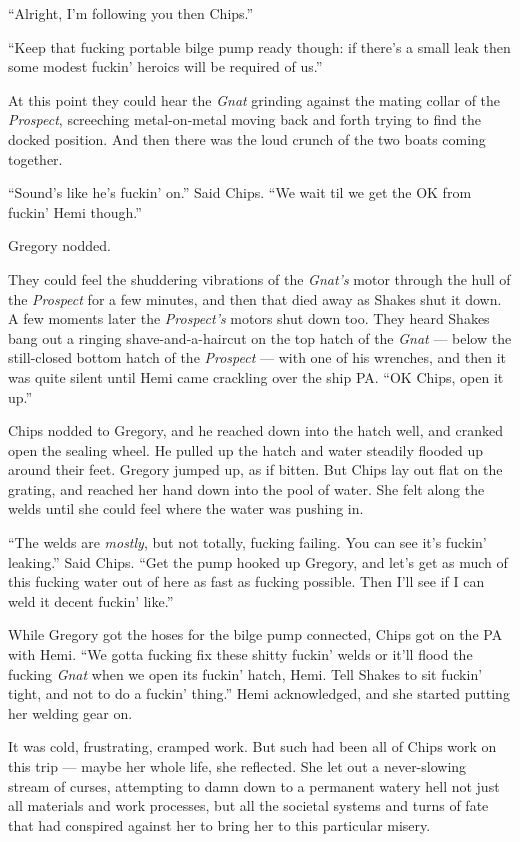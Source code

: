 \documentclass[
]{scrbook}
\begin{document}
``Alright, I'm following you then Chips.''

``Keep that fucking portable bilge pump ready though: if there's a small
leak then some modest fuckin' heroics will be required of us.''

At this point they could hear the \emph{Gnat} grinding against the
mating collar of the \emph{Prospect}, screeching metal-on-metal moving
back and forth trying to find the docked position. And then there was
the loud crunch of the two boats coming together.

``Sound's like he's fuckin' on.'' Said Chips. ``We wait til we get the
OK from fuckin' Hemi though.''

Gregory nodded.

They could feel the shuddering vibrations of the \emph{Gnat's} motor
through the hull of the \emph{Prospect} for a few minutes, and then that
died away as Shakes shut it down. A few moments later the
\emph{Prospect's} motors shut down too. They heard Shakes bang out a
ringing shave-and-a-haircut on the top hatch of the \emph{Gnat} ---
below the still-closed bottom hatch of the \emph{Prospect} --- with one
of his wrenches, and then it was quite silent until Hemi came crackling
over the ship PA. ``OK Chips, open it up.''

Chips nodded to Gregory, and he reached down into the hatch well, and
cranked open the sealing wheel. He pulled up the hatch and water
steadily flooded up around their feet. Gregory jumped up, as if bitten.
But Chips lay out flat on the grating, and reached her hand down into
the pool of water. She felt along the welds until she could feel where
the water was pushing in.

``The welds are \emph{mostly}, but not totally, fucking failing. You can
see it's fuckin' leaking.'' Said Chips. ``Get the pump hooked up
Gregory, and let's get as much of this fucking water out of here as fast
as fucking possible. Then I'll see if I can weld it decent fuckin'
like.''

While Gregory got the hoses for the bilge pump connected, Chips got on
the PA with Hemi. ``We gotta fucking fix these shitty fuckin' welds or
it'll flood the fucking \emph{Gnat} when we open its fuckin' hatch,
Hemi. Tell Shakes to sit fuckin' tight, and not to do a fuckin' thing.''
Hemi acknowledged, and she started putting her welding gear on.

It was cold, frustrating, cramped work. But such had been all of Chips
work on this trip --- maybe her whole life, she reflected. She let out a
never-slowing stream of curses, attempting to damn down to a permanent
watery hell not just all materials and work processes, but all the
societal systems and turns of fate that had conspired against her to
bring her to this particular misery.
\end{document}

